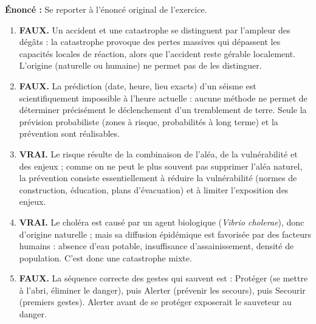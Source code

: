 \documentclass[11pt]{article}
\newcommand{\cle}[1]{{\popxbold\color{popdark}#1}}
\begin{document}
\begin{corrige}
\textbf{Énoncé :} Se reporter à l'énoncé original de l'exercice.
\tcblower
\begin{enumerate}
\item \textbf{FAUX.} Un accident et une catastrophe se distinguent par l'ampleur des dégâts : la catastrophe provoque des pertes massives qui dépassent les capacités locales de réaction, alors que l'accident reste gérable localement. L'origine (naturelle ou humaine) ne permet pas de les distinguer.
\item \textbf{FAUX.} La prédiction (date, heure, lieu exacts) d'un séisme est scientifiquement impossible à l'heure actuelle : aucune méthode ne permet de déterminer précisément le déclenchement d'un tremblement de terre. Seule la prévision probabiliste (zones à risque, probabilités à long terme) et la prévention sont réalisables.
\item \textbf{VRAI.} Le risque résulte de la combinaison de l'aléa, de la vulnérabilité et des enjeux ; comme on ne peut le plus souvent pas supprimer l'aléa naturel, la prévention consiste essentiellement à réduire la vulnérabilité (normes de construction, éducation, plans d'évacuation) et à limiter l'exposition des enjeux.
\item \textbf{VRAI.} Le choléra est causé par un agent biologique (\emph{Vibrio cholerae}), donc d'origine naturelle ; mais sa diffusion épidémique est favorisée par des facteurs humains : absence d'eau potable, insuffisance d'assainissement, densité de population. C'est donc une catastrophe mixte.
\item \textbf{FAUX.} La séquence correcte des gestes qui sauvent est : \cle{Protéger} (se mettre à l'abri, éliminer le danger), puis \cle{Alerter} (prévenir les secours), puis \cle{Secourir} (premiers gestes). Alerter avant de se protéger exposerait le sauveteur au danger.
\end{enumerate}
\end{corrige}
\end{document}
